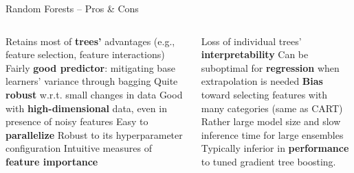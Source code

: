 \begin{frame2}{Random Forests -- Pros \& Cons}

  \begin{columns}[onlytextwidth]
    \begin{column}{0.6\textwidth}
      \begin{itemize}
        \positem Retains most of \textbf{trees'} advantages (e.g., feature selection, feature interactions)
        \positem Fairly \textbf{good predictor}: mitigating base learners' variance through bagging
        \positem Quite \textbf{robust} w.r.t. small changes in data
        \positem Good with \textbf{high-dimensional} data, even in presence of noisy features
        \positem Easy to \textbf{parallelize}
        \positem Robust to its hyperparameter configuration
        \positem Intuitive measures of \textbf{feature importance}
      \end{itemize}
    \end{column}
    \begin{column}{0.4\textwidth}
      \begin{itemize}
        \negitem Loss of individual trees' \textbf{interpretability}
        \negitem Can be suboptimal for \textbf{regression} when extrapolation is needed
        \negitem \textbf{Bias} toward selecting features with many categories (same as CART)
        \negitem Rather large model size and slow inference time for large ensembles
        \negitem Typically inferior in \textbf{performance} to tuned gradient tree boosting.
      \end{itemize}
    \end{column}
  \end{columns}
  
\end{frame2}